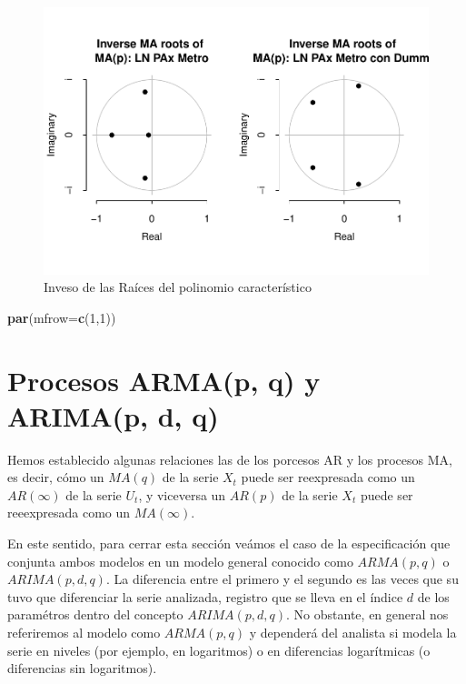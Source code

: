 \documentclass[
]{book}
\newenvironment{Shaded}{\begin{snugshade}}{\end{snugshade}}
\newcommand{\AttributeTok}[1]{\textcolor[rgb]{0.13,0.29,0.53}{#1}}
\newcommand{\DecValTok}[1]{\textcolor[rgb]{0.00,0.00,0.81}{#1}}
\newcommand{\FunctionTok}[1]{\textcolor[rgb]{0.13,0.29,0.53}{\textbf{#1}}}
\newcommand{\NormalTok}[1]{#1}
\begin{document}
\begin{figure}

{\centering \includegraphics{Notas-Series-Tiempo_files/figure-latex/fig411-1} 

}

\caption{Inveso de las Raíces del polinomio característico}\label{fig:fig411}
\end{figure}

\begin{Shaded}
\begin{Highlighting}[]
\FunctionTok{par}\NormalTok{(}\AttributeTok{mfrow=}\FunctionTok{c}\NormalTok{(}\DecValTok{1}\NormalTok{,}\DecValTok{1}\NormalTok{))}
\end{Highlighting}
\end{Shaded}

\hypertarget{procesos-armap-q-y-arimap-d-q}{%
\section{Procesos ARMA(p, q) y ARIMA(p, d, q)}\label{procesos-armap-q-y-arimap-d-q}}

Hemos establecido algunas relaciones las de los porcesos AR y los procesos MA, es decir, cómo un \(MA(q)\) de la serie \(X_t\) puede ser reexpresada como un \(AR(\infty)\) de la serie \(U_t\), y viceversa un \(AR(p)\) de la serie \(X_t\) puede ser reeexpresada como un \(MA(\infty)\).

En este sentido, para cerrar esta sección veámos el caso de la especificación que conjunta ambos modelos en un modelo general conocido como \(ARMA(p, q)\) o \(ARIMA(p, d, q)\). La diferencia entre el primero y el segundo es las veces que su tuvo que diferenciar la serie analizada, registro que se lleva en el índice \(d\) de los paramétros dentro del concepto \(ARIMA(p, d, q)\). No obstante, en general nos referiremos al modelo como \(ARMA(p, q)\) y dependerá del analista si modela la serie en niveles (por ejemplo, en logaritmos) o en diferencias logarítmicas (o diferencias sin logaritmos).
\end{document}
